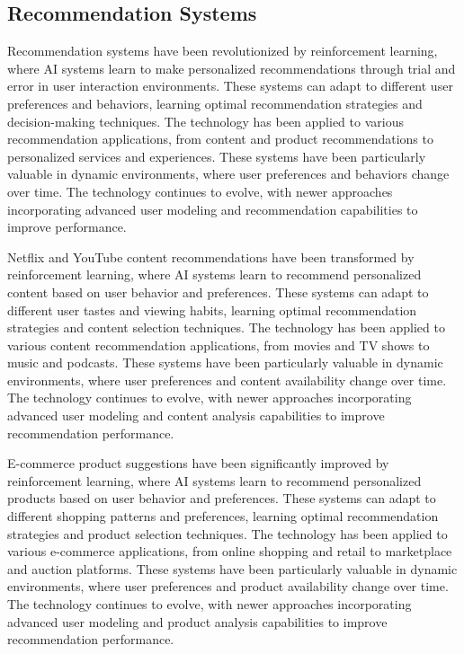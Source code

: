 \subsection{Recommendation Systems}

Recommendation systems have been revolutionized by reinforcement learning, where AI systems learn to make personalized recommendations through trial and error in user interaction environments. These systems can adapt to different user preferences and behaviors, learning optimal recommendation strategies and decision-making techniques. The technology has been applied to various recommendation applications, from content and product recommendations to personalized services and experiences. These systems have been particularly valuable in dynamic environments, where user preferences and behaviors change over time. The technology continues to evolve, with newer approaches incorporating advanced user modeling and recommendation capabilities to improve performance.

Netflix and YouTube content recommendations have been transformed by reinforcement learning, where AI systems learn to recommend personalized content based on user behavior and preferences. These systems can adapt to different user tastes and viewing habits, learning optimal recommendation strategies and content selection techniques. The technology has been applied to various content recommendation applications, from movies and TV shows to music and podcasts. These systems have been particularly valuable in dynamic environments, where user preferences and content availability change over time. The technology continues to evolve, with newer approaches incorporating advanced user modeling and content analysis capabilities to improve recommendation performance.

E-commerce product suggestions have been significantly improved by reinforcement learning, where AI systems learn to recommend personalized products based on user behavior and preferences. These systems can adapt to different shopping patterns and preferences, learning optimal recommendation strategies and product selection techniques. The technology has been applied to various e-commerce applications, from online shopping and retail to marketplace and auction platforms. These systems have been particularly valuable in dynamic environments, where user preferences and product availability change over time. The technology continues to evolve, with newer approaches incorporating advanced user modeling and product analysis capabilities to improve recommendation performance.

